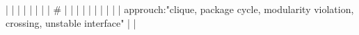 |    |            |      |                                                                      |                                                                                                                                                                          |                                                                                                                                                                                                                                                            |                                                                                                                                                                                                                                                                      |  #                                                                                                                                                                                                                                                                                                       |                                                                                                                                                                                                                                                                                                                                                                                                                                                                                              |
|    |            |      |                                                                      |                                                                                                                                                                          |                                                                                                                                                                                                                                                            |                                                                                                                                                                                                                                                                      |  approuch:"clique, package cycle, modularity violation, crossing, unstable interface"                                                                                                                                                                                                                    |                                                                                                                                                                                                                                                                                                                                                                                                                                                                                              |
